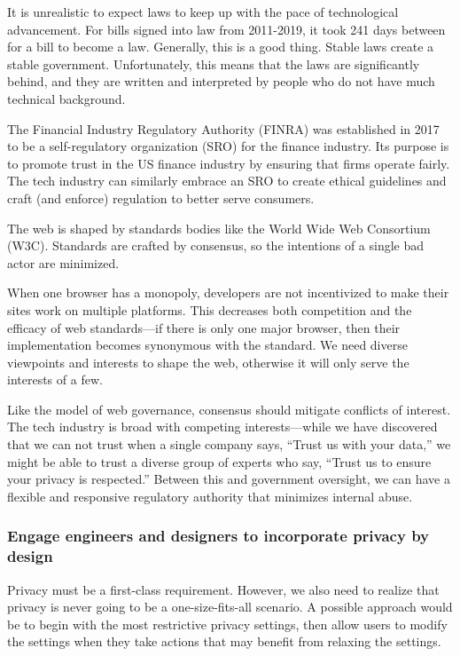 It is unrealistic to expect laws to keep up with the pace of technological advancement. For bills signed into law from 2011-2019, it took 241 days between for a bill to become a law. Generally, this is a good thing. Stable laws create a stable government. Unfortunately, this means that the laws are significantly behind, and they are written and interpreted by people who do not have much technical background.

The Financial Industry Regulatory Authority (FINRA) was established in 2017 to be a self-regulatory organization (SRO) for the finance industry. Its purpose is to promote trust in the US finance industry by ensuring that firms operate fairly. The tech industry can similarly embrace an SRO to create ethical guidelines and craft (and enforce) regulation to better serve consumers\cite{reich}.

The web is shaped by standards bodies like the World Wide Web Consortium (W3C). Standards are crafted by consensus, so the intentions of a single bad actor are minimized.

When one browser has a monopoly, developers are not incentivized to make their sites work on multiple platforms. This decreases both competition and the efficacy of web standards---if there is only one major browser, then their implementation becomes synonymous with the standard. We need diverse viewpoints and interests to shape the web, otherwise it will only serve the interests of a few.

Like the model of web governance, consensus should mitigate conflicts of interest. The tech industry is broad with competing interests---while we have discovered that we can not trust when a single company says, ``Trust us with your data,'' we might be able to trust a diverse group of experts who say, ``Trust us to ensure your privacy is respected.'' Between this and government oversight, we can have a flexible and responsive regulatory authority that minimizes internal abuse.

\subsubsection{Engage engineers and designers to incorporate privacy by design}

Privacy must be a first-class requirement. However, we also need to realize that privacy is never going to be a one-size-fits-all scenario. A possible approach would be to begin with the most restrictive privacy settings, then allow users to modify the settings when they take actions that may benefit from relaxing the settings.

